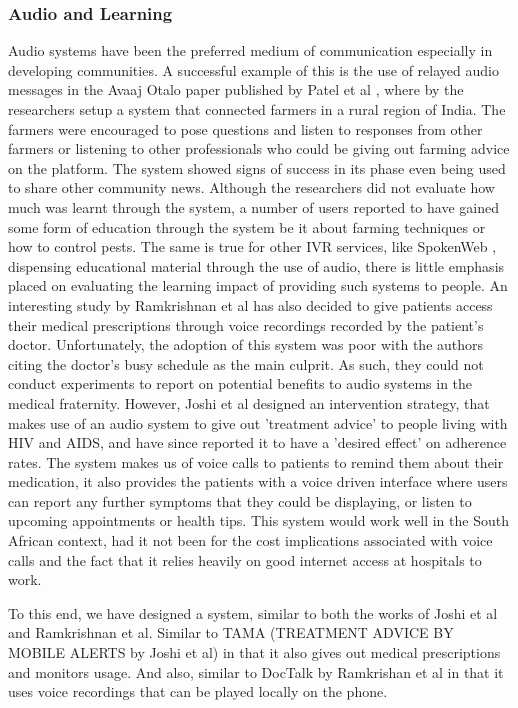 \subsubsection{Audio and Learning}
Audio systems have been the preferred medium of communication especially in developing communities. A successful example of this is the use of relayed audio messages in the Avaaj Otalo paper published by Patel et al \cite{Patel10}, where by the researchers setup a system that connected farmers in a rural region of India. The farmers were encouraged to pose questions and listen to responses from other farmers or listening to other professionals who could be giving out farming advice on the platform. The system showed signs of success in its phase even being used to share other community news. Although the researchers did not evaluate how much was learnt through the system, a number of users reported to have gained some form of education through the system be it about farming techniques or how to control pests. The same is true for other IVR services, like SpokenWeb \cite{Spoken10}, dispensing educational material through the use of audio, there is little emphasis placed on evaluating the learning impact of providing such systems to people.
An interesting study by Ramkrishnan et al\cite{DocTalk} has also decided to give patients access their medical prescriptions through voice recordings recorded by the patient's doctor. Unfortunately, the adoption of this system was poor with the authors citing the doctor's busy schedule as the main culprit. As such, they could not conduct experiments to report on potential benefits to audio systems in the medical fraternity. However, Joshi et al \cite{Joshi13} designed an intervention strategy, that makes use of an audio system to give out 'treatment advice' to people living with HIV and AIDS, and have since reported it to have a 'desired effect' on adherence rates. The system makes us of voice calls to patients to remind them about their medication, it also provides the patients with a voice driven interface where users can report any further symptoms that they could be displaying, or listen to upcoming appointments or health tips. This system would work well in the South African context, had it not been for the cost implications associated with voice calls and the fact that it relies heavily on good internet access at hospitals to work.

To this end, we have designed a system, similar to both the works of Joshi et al \cite{Joshi13} and Ramkrishnan et al\cite{DocTalk}. Similar to TAMA (TREATMENT ADVICE BY MOBILE ALERTS by Joshi et al) in that it also gives out medical prescriptions and monitors usage. And also, similar to DocTalk by Ramkrishan et al in that it uses voice recordings that can be played locally on the phone.
